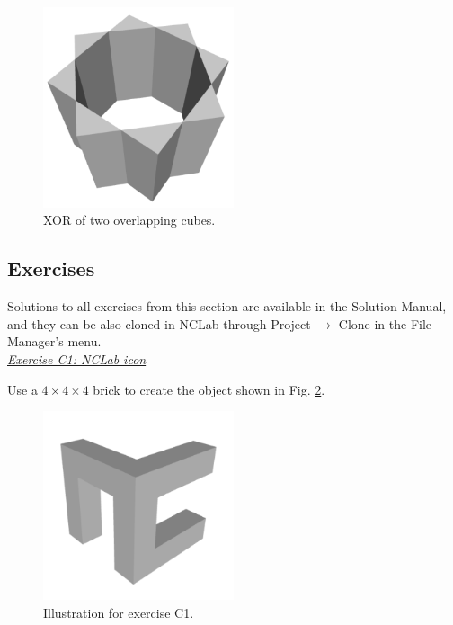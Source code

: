 \documentclass[article,A4,12pt]{llncs}
\begin{document}
\newpage

\begin{figure}[!ht]
\begin{center}
\includegraphics[width=0.5\textwidth]{img/xor-1.png}
\end{center}
\vspace{-2mm}
\caption{XOR of two overlapping cubes.}
\label{fig:xor-1}
\end{figure}
\noindent

\subsection{Exercises}

Solutions to all exercises from this section are available in the Solution Manual, and 
they can be also cloned in NCLab through Project $\rightarrow$ Clone in the 
File Manager's menu.\\

\noindent
\underline{\em Exercise C1: NCLab icon}

Use a $4 \times 4 \times 4$ brick to create the object shown in 
Fig. \ref{fig:nclabicon}.

\newpage

\begin{figure}[!ht]
\begin{center}
\includegraphics[width=0.5\textwidth]{img/nclabicon.png}
\end{center}
\vspace{-2mm}
\caption{Illustration for exercise C1.}
\label{fig:nclabicon}
\end{figure}
\noindent
\end{document}
